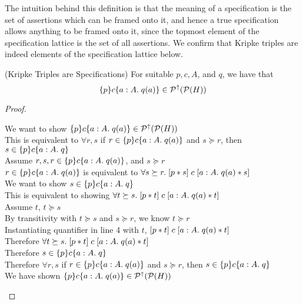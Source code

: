 The intuition behind this definition is that the meaning of a
specification is the set of assertions which can be framed onto it,
and hence a true specification allows anything to be framed onto it,
since the topmost element of the specification lattice is the set of 
all assertions. We confirm that Kripke triples are indeed elements of
the specification lattice below. 

\begin{lemma}{(Kripke Triples are Specifications)}
  For suitable $p,c,A$, and $q$, we have that 
\begin{displaymath}
\{{p}\}{c}\{{a:A}.\;{q(a)}\} \in \mathcal{P}^{\uparrow}({\mathcal{P}(H)})
\end{displaymath}
\end{lemma}

\begin{proof}
\begin{tabbedproof}
\oo We want to show $\{{p}\}{c}\{{a:A}.\;{q(a)}\} \in \mathcal{P}^{\uparrow}({\mathcal{P}(H)})$ \\
\oo This is equivalent to $\forall r,s$ if $r \in \{{p}\}{c}\{{a:A}.\;{q(a)}\}$ and $s \succeq r$,
then $s \in \{{p}\}{c}\{{a:A}.\;{q}\}$ \\
\oo Assume $r,s, r \in \{{p}\}{c}\{{a:A}.\;{q(a)}\}$, and $s \succeq r$ \\
\ooo $r \in \{{p}\}{c}\{{a:A}.\;{q(a)}\}$ is equivalent to 
     $\forall s \succeq r.\; [{p * s}]\;{c}\;[{a:A}.\;{q(a) * s}]$ \\
\ooo We want to show $s \in \{{p}\}{c}\{{a:A}.\;{q}\}$ \\
\ooo This is equivalent to showing 
     $\forall t \succeq s.\; [{p * t}]\;{c}\;[{a:A}.\;{q(a) * t}]$ \\
\ooo Assume $t$, $t \succeq s$ \\
\oooo By transitivity with $t \succeq s$ and $s \succeq r$, we know $t \succeq r$ \\
\oooo Instantiating quantifier in line 4 with $t$, $[{p * t}]\;{c}\;[{a:A}.\;{q(a) * t}]$ \\
\ooo Therefore $\forall t \succeq s.\; [{p * t}]\;{c}\;[{a:A}.\;{q(a) * t}]$ \\
\ooo Therefore $s \in \{{p}\}{c}\{{a:A}.\;{q}\}$ \\
\oo Therefore $\forall r,s$ if $r \in \{{p}\}{c}\{{a:A}.\;{q(a)}\}$ and $s \succeq r$,
    then $s \in \{{p}\}{c}\{{a:A}.\;{q}\}$ \\
\oo We have shown $\{{p}\}{c}\{{a:A}.\;{q(a)}\} \in \mathcal{P}^{\uparrow}({\mathcal{P}(H)})$ \\ 
\end{tabbedproof}
\end{proof}

